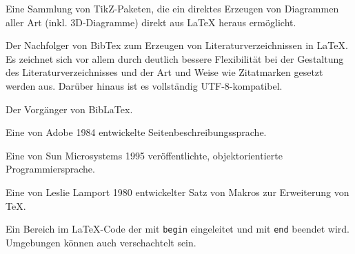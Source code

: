 %
{%
Eine Sammlung von TikZ-Paketen, die ein direktes Erzeugen von Diagrammen aller
Art (inkl. 3D-Diagramme) direkt aus LaTeX heraus ermöglicht.}

%
{%
Der Nachfolger von BibTex zum Erzeugen von Literaturverzeichnissen in LaTeX. Es
zeichnet sich vor allem durch deutlich bessere Flexibilität bei der Gestaltung
des Literaturverzeichnisses und der Art und Weise wie Zitatmarken gesetzt werden
aus. Darüber hinaus ist es vollständig UTF-8-kompatibel.
}

%
{%
Der Vorgänger von BibLaTex.}

%
{%
Eine von Adobe 1984 entwickelte Seitenbeschreibungssprache.}

%
{%
Eine von Sun Microsystems 1995 veröffentlichte, objektorientierte Programmiersprache.}

%
{%
Eine von Leslie Lamport 1980 entwickelter Satz von Makros zur Erweiterung von TeX.}


%
{%
Ein Bereich im LaTeX-Code der mit \texttt{begin} eingeleitet und mit \texttt{end}
beendet wird. Umgebungen können auch verschachtelt sein.}
